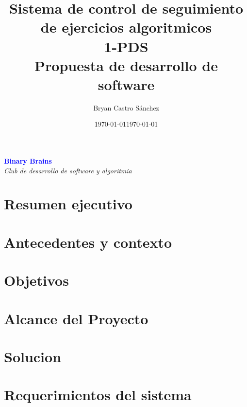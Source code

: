 \documentclass[10pt, oneside, openany]{book}
\begin{document}
\title{\textbf{\huge Sistema de control de seguimiento de ejercicios algoritmicos \\[0.5em] \LARGE 1-PDS \\ \Large Propuesta de desarrollo de software}}
\author{Bryan Castro Sánchez}
\date{\today}

    \maketitle
    \vspace{-1em} 
    \begin{center}
    \end{center}

    \begin{center}
        \textcolor{blue}{\textbf{Binary Brains}} \\[0.3em]
        \textit{Club de desarrollo de software y algoritmia} \\[2em]
        \date{\today}
    \end{center}

    \newpage
    \chapter{Resumen ejecutivo}
    \label{ch:resumen}
    
    \chapter{Antecedentes y contexto}
    \label{ch:contexto}
    
    \chapter{Objetivos}
    \label{ch:objetivos}
    
    \chapter{Alcance del Proyecto}
    \label{ch:Alcance}
    
    \chapter{Solucion}
    \label{ch:solución}
    
    \chapter{Requerimientos del sistema}
    \label{ch:requerimientos}
    
\end{document}
